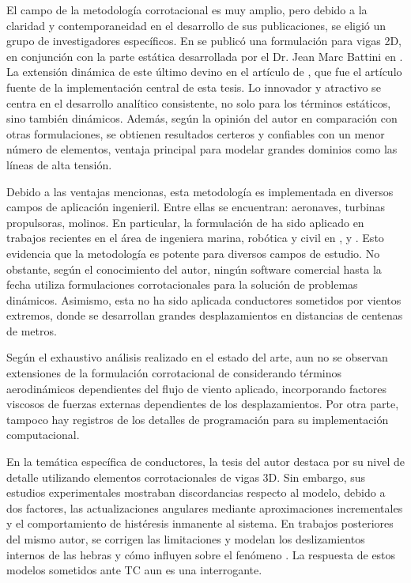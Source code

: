 El campo de la metodología corrotacional es muy amplio, pero debido a la claridad y contemporaneidad en el desarrollo de sus publicaciones, se eligió un grupo de investigadores específicos. En \citep{Le2011} se publicó una formulación para vigas 2D, en conjunción con la parte estática desarrollada por el Dr. Jean Marc Battini  en \citep{Battini2002}. La extensión dinámica de este último devino en el artículo de \citep{Le2014}, que fue el artículo fuente de la implementación central de esta tesis. Lo innovador y atractivo se centra en el desarrollo analítico consistente, no solo para los términos estáticos, sino también dinámicos. Además, según la opinión del autor en comparación con otras formulaciones, se obtienen resultados certeros y confiables con un menor número de elementos, ventaja principal para modelar grandes dominios como las líneas de alta tensión.  

Debido a las ventajas mencionas, esta metodología es implementada en diversos campos de aplicación ingenieril. Entre ellas se encuentran: aeronaves, turbinas propulsoras, molinos. En particular, la formulación de \citep{Le2014} ha sido aplicado en trabajos recientes en el área de ingeniera marina, robótica y civil en \citep{albino2018co}, \cite{asadi2019multibody} y \cite{viana2020formulation}. Esto evidencia que la metodología es potente para diversos campos de estudio. No obstante, según el conocimiento del autor, ningún software comercial hasta la fecha utiliza formulaciones corrotacionales para la solución de problemas dinámicos. Asimismo, esta no ha sido aplicada conductores sometidos por vientos extremos, donde se desarrollan grandes desplazamientos en distancias de centenas de metros. 


Según el exhaustivo análisis realizado en el estado del arte, aun no se observan extensiones de la formulación corrotacional de \cite{Le2014} considerando términos aerodinámicos dependientes del flujo de viento aplicado, incorporando factores viscosos de fuerzas externas dependientes de los desplazamientos. Por otra parte, tampoco hay registros de los detalles de programación para su implementación computacional.

En la temática específica de conductores, la tesis del autor \citet{foti2013corotational} destaca por su nivel de detalle utilizando elementos corrotacionales de vigas 3D. Sin embargo, sus estudios experimentales mostraban discordancias respecto al modelo, debido a dos factores, las actualizaciones angulares mediante aproximaciones incrementales y el comportamiento de histéresis inmanente al sistema. En trabajos posteriores del mismo autor, se corrigen las limitaciones y modelan los deslizamientos internos de las hebras y cómo influyen sobre el fenómeno \citet{foti2018finite}. La respuesta de estos modelos sometidos ante \gls{TC} aun es una interrogante.



